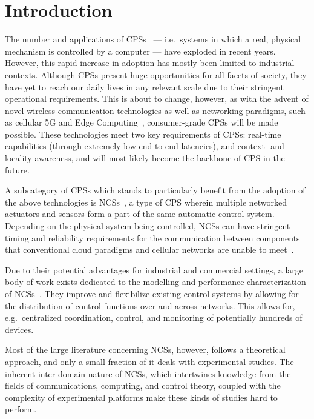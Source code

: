 \section{Introduction}\label{sec:intro}

The number and applications of \acp{CPS}~\cite{Rajkumar2010CPS} --- i.e.\ systems in which a real, physical mechanism is controlled by a computer --- have exploded in recent years.
However, this rapid increase in adoption has mostly been limited to industrial contexts.
Although \acp{CPS} present huge opportunities for all facets of society, they have yet to reach our daily lives in any relevant scale due to their stringent operational requirements.
This is about to change, however, as with the advent of novel wireless communication technologies as well as networking paradigms, such as cellular 5G and Edge Computing~\cite{Satya2017Emergence}, consumer-grade \acp{CPS} will be made possible.
These technologies meet two key requirements of \acp{CPS}: real-time capabilities (through extremely low end-to-end latencies), and context- and locality-awareness, and will most likely become the backbone of \ac{CPS} in the future.

A subcategory of \acp{CPS} which stands to particularly benefit from the adoption of the above technologies is \acp{NCS}~\cite{Gupta2010NCSOverview}, a type of \ac{CPS} wherein multiple networked actuators and sensors form a part of the same automatic control system.
Depending on the physical system being controlled, \acp{NCS} can have stringent timing and reliability requirements for the communication between components that conventional cloud paradigms and cellular networks are unable to meet~\cite{Wan2020Efficient}.

Due to their potential advantages for industrial and commercial settings, a large body of work exists dedicated to the modelling and performance characterization of \acp{NCS}~\cite{Zhang2013Survey,Zhang2016Survey}.
They improve and flexibilize existing control systems by allowing for the distribution of control functions over and across networks.
This allows for, e.g.\ centralized coordination, control, and monitoring of potentially hundreds of devices.

Most of the large literature concerning \acp{NCS}, however, follows a theoretical approach, and only a small fraction of it deals with experimental studies.
The inherent inter-domain nature of \acp{NCS}, which intertwines knowledge from the fields of communications, computing, and control theory, coupled with the complexity of experimental platforms make these kinds of studies hard to perform.

